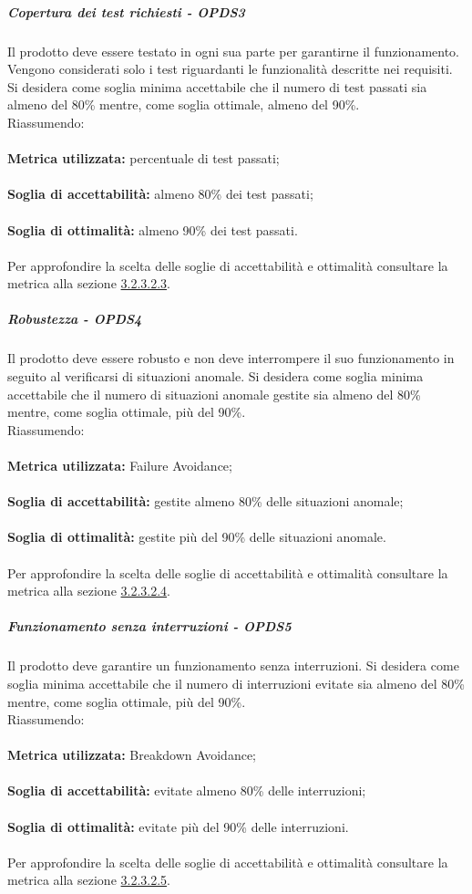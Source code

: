 \documentclass[PianoDiQualifica.tex]{subfiles}
\begin{document}
				\subparagraph{Copertura dei test richiesti - OPDS3}
				Il prodotto deve essere testato in ogni sua parte per garantirne il funzionamento. Vengono considerati solo i test riguardanti le funzionalità descritte nei requisiti.
				Si desidera come soglia minima accettabile che il numero di test passati sia almeno del 80\% mentre, come soglia ottimale, almeno del 90\%. \\
				Riassumendo: \\ \\
				\textbf{Metrica utilizzata:} percentuale di test passati;\\ \\
				\textbf{Soglia di accettabilità:} almeno 80\% dei test passati; \\ \\
				\textbf{Soglia di ottimalità:} almeno 90\% dei test passati. \\ \\
				Per approfondire la scelta delle soglie di accettabilità e ottimalità consultare la metrica alla sezione \hyperlink{test_passati}{3.2.3.2.3}.
				
				\subparagraph{Robustezza - OPDS4}
				Il prodotto deve essere robusto e non deve interrompere il suo funzionamento in seguito al verificarsi di situazioni anomale.
				Si desidera come soglia minima accettabile che il numero di situazioni anomale gestite sia almeno del 80\% mentre, come soglia ottimale, più del 90\%. \\
				Riassumendo: \\ \\
				\textbf{Metrica utilizzata:} Failure Avoidance;\\ \\
				\textbf{Soglia di accettabilità:} gestite almeno 80\% delle situazioni anomale; \\ \\
				\textbf{Soglia di ottimalità:} gestite più del 90\% delle situazioni anomale. \\ \\
				Per approfondire la scelta delle soglie di accettabilità e ottimalità consultare la metrica alla sezione \hyperlink{failure}{3.2.3.2.4}.
				
				\subparagraph{Funzionamento senza interruzioni - OPDS5}
				Il prodotto deve garantire un funzionamento senza interruzioni.
				Si desidera come soglia minima accettabile che il numero di interruzioni evitate sia almeno del 80\% mentre, come soglia ottimale, più del 90\%. \\
				Riassumendo: \\ \\
				\textbf{Metrica utilizzata:} Breakdown Avoidance;\\ \\
				\textbf{Soglia di accettabilità:} evitate almeno 80\% delle interruzioni; \\ \\
				\textbf{Soglia di ottimalità:} evitate più del 90\% delle interruzioni. \\ \\
				Per approfondire la scelta delle soglie di accettabilità e ottimalità consultare la metrica alla sezione \hyperlink{breakdown}{3.2.3.2.5}.
				
\end{document}
